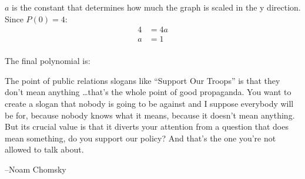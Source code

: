 \documentclass{exam}
\begin{document}
\begin{description}
        $a$ is the constant that determines how much the graph is scaled in the y direction.  Since $P(0) = 4$:
        \begin{align*}
          4 &= 4a \\
          a &= 1 \\
        \end{align*}

        The final polynomial is: 

    \end{description}
  \else
    \vspace{3 cm}
    \begin{em}
      The point of public relations slogans like ``Support Our Troops'' is that they don't mean anything \ldots that's
      the whole point of good propaganda. You want to create a slogan that nobody is going to be against and I suppose
      everybody will be for, because nobody knows what it means, because it doesn't mean anything. But its crucial value
      is that it diverts your attention from a question that does mean something, do you support our policy? And that's
      the one you're not allowed to talk about.
    \end{em}

    \hspace{1 cm} --Noam Chomsky
  \fi
\end{document}
